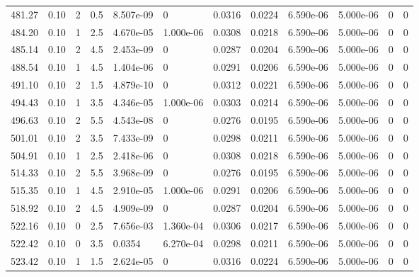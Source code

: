 \documentclass[preview]{standalone}
\begin{document}
{{{{{\begin{tabular}{L{1.2cm}C{1.2cm} C{0.3cm}C{0.5cm} C{1.4cm}C{1.4cm} C{1.4cm}C{1.4cm} C{1.6cm}C{1.6cm} C{1.6cm}C{1.6cm}}
  481.27  &  0.10  & 2     & 0.5 &  8.507e-09  & 0  &  0.0316&   0.0224& 6.590e-06 & 5.000e-06   &  0 & 0  \\ 
  484.20  &  0.10  & 1     & 2.5 &  4.670e-05  & 1.000e-06  &  0.0308&   0.0218& 6.590e-06 & 5.000e-06   &  0 & 0  \\ 
  485.14  &  0.10  & 2     & 4.5 &  2.453e-09  & 0  &  0.0287&   0.0204& 6.590e-06 & 5.000e-06   &  0 & 0  \\ 
  488.54  &  0.10  & 1     & 4.5 &  1.404e-06  & 0  &  0.0291&   0.0206& 6.590e-06 & 5.000e-06   &  0 & 0  \\ 
  491.10  &  0.10  & 2     & 1.5 &  4.879e-10  & 0  &  0.0312&   0.0221& 6.590e-06 & 5.000e-06   &  0 & 0  \\ 
  494.43  &  0.10  & 1     & 3.5 &  4.346e-05  & 1.000e-06  &  0.0303&   0.0214& 6.590e-06 & 5.000e-06   &  0 & 0  \\ 
  496.63  &  0.10  & 2     & 5.5 &  4.543e-08  & 0  &  0.0276&   0.0195& 6.590e-06 & 5.000e-06   &  0 & 0  \\ 
  501.01  &  0.10  & 2     & 3.5 &  7.433e-09  & 0  &  0.0298&   0.0211& 6.590e-06 & 5.000e-06   &  0 & 0  \\ 
  504.91  &  0.10  & 1     & 2.5 &  2.418e-06  & 0  &  0.0308&   0.0218& 6.590e-06 & 5.000e-06   &  0 & 0  \\ 
  514.33  &  0.10  & 2     & 5.5 &  3.968e-09  & 0  &  0.0276&   0.0195& 6.590e-06 & 5.000e-06   &  0 & 0  \\ 
  515.35  &  0.10  & 1     & 4.5 &  2.910e-05  & 1.000e-06  &  0.0291&   0.0206& 6.590e-06 & 5.000e-06   &  0 & 0  \\ 
  518.92  &  0.10  & 2     & 4.5 &  4.909e-09  & 0  &  0.0287&   0.0204& 6.590e-06 & 5.000e-06   &  0 & 0  \\ 
  522.16  &  0.10  & 0     & 2.5 &  7.656e-03  & 1.360e-04  &  0.0306&   0.0217& 6.590e-06 & 5.000e-06   &  0 & 0  \\ 
  522.42  &  0.10  & 0     & 3.5 &  0.0354  & 6.270e-04  &  0.0298&   0.0211& 6.590e-06 & 5.000e-06   &  0 & 0  \\ 
  523.42  &  0.10  & 1     & 1.5 &  2.624e-05  & 0  &  0.0316&   0.0224& 6.590e-06 & 5.000e-06   &  0 & 0  \\ 
\hline 
\end{tabular} 

}}}}}
\end{document}
